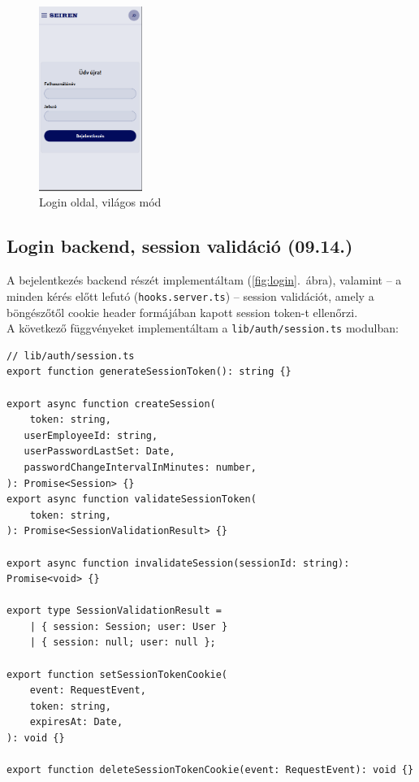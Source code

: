 \documentclass[a4paper]{article}
\newcommand{\inlts}[1]{\texttt{#1}}
\newcommand{\inltxt}[1]{\texttt{#1}}
\begin{document}
\begin{figure}[ht]
  \centering
  \includegraphics[clip, trim=0 10 1 0, width = 0.3\textwidth]{images/login_page.png}
  \caption{Login oldal, világos mód}
  \label{fig:login_page}
\end{figure}

\subsection{Login backend, session validáció (09.14.)}

A bejelentkezés backend részét implementáltam (\ref{fig:login}.~ábra), valamint – a minden
kérés előtt lefutó (\inlts{hooks.server.ts}) – session validációt, amely a böngészőtől cookie
header formájában kapott session token-t ellenőrzi. \\

A következő függvényeket implementáltam a \inltxt{lib/auth/session.ts} modulban:

\FloatBarrier
\begin{verbatim}
// lib/auth/session.ts
export function generateSessionToken(): string {}

export async function createSession(
    token: string,
   userEmployeeId: string,
   userPasswordLastSet: Date,
   passwordChangeIntervalInMinutes: number,
): Promise<Session> {}
export async function validateSessionToken(
    token: string,
): Promise<SessionValidationResult> {}

export async function invalidateSession(sessionId: string): Promise<void> {}

export type SessionValidationResult =
    | { session: Session; user: User }
    | { session: null; user: null };

export function setSessionTokenCookie(
    event: RequestEvent,
    token: string,
    expiresAt: Date,
): void {}

export function deleteSessionTokenCookie(event: RequestEvent): void {}
\end{verbatim}
\end{document}
